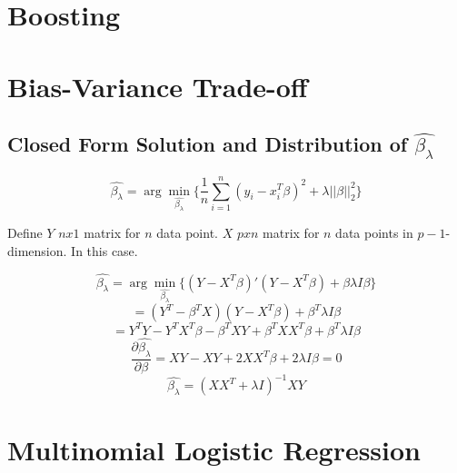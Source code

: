 \documentclass[letter,11pt]{article}
\begin{document}
	\section{Boosting}
	
	\section{Bias-Variance Trade-off}
	\subsection{Closed Form Solution and Distribution of $\hat{\beta_\lambda}$}
	
	\begin{equation}
	\hat{\beta_\lambda} = \arg \min_{\hat{\beta_\lambda}} \bigg\{\frac{1}{n}\sum_{i=1}^{n}(y_i-x_i^T\beta)^2 + \lambda||\beta||_2^2\bigg\}
	\end{equation}
	
	Define $Y$ $nx1$ matrix for $n$ data point. $X$ $pxn$ matrix for $n$ data points in $p-1$-dimension. In this case.
	
	\begin{equation}
	\hat{\beta_\lambda} = \arg \min_{\hat{\beta_\lambda}} \bigg\{(Y-X^T\beta)'(Y-X^T\beta) +\beta\lambda I\beta \bigg\}
	\end{equation}
	$$ = (Y^T-\beta^TX)(Y-X^T\beta) + \beta^T\lambda I \beta$$
	$$ = Y^TY - Y^TX^T\beta-\beta^TXY + \beta^TXX^T\beta + \beta^T\lambda I \beta$$
	\begin{equation}
	\frac{\partial \hat{\beta_\lambda}}{\partial \beta} = XY - XY + 2XX^T\beta + 2\lambda I \beta = 0
	\end{equation}	
	\begin{equation}
	\hat{\beta_\lambda} = (XX^T + \lambda I)^{-1} XY
	\end{equation}















		\section{Multinomial Logistic Regression}
		
\end{document}
